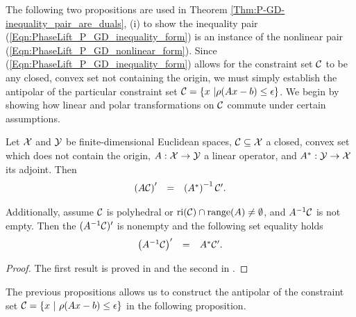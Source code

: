 The following two propositions are used in Theorem \ref{Thm:P-GD-inequality_pair_are_duals}, (i) to show the inequality pair (\ref{Eqn:PhaseLift_P_GD_inequality_form}) is an instance of the nonlinear pair (\ref{Eqn:PhaseLift_P_GD_nonlinear_form}).  Since (\ref{Eqn:PhaseLift_P_GD_inequality_form}) allows for the constraint set ${\mathcal C}$ to be any closed, convex set not containing the origin, we must simply establish the antipolar of the particular constraint set ${\mathcal C} = \{ x \ | \rho(Ax-b) \leq \epsilon\}$.  We begin by showing how linear and polar transformations on ${\mathcal C}$ commute under certain assumptions.


\begin{prop}		\label{Prop:antipolar_set_equalities}
Let ${\mathcal X}$ and ${\mathcal Y}$ be finite-dimensional Euclidean spaces, ${\mathcal C} \subseteq {\mathcal X}$ a closed, convex set which does not contain the origin, $A : {\mathcal X} \rightarrow {\mathcal Y}$ a linear operator, and $A^* : {\mathcal Y} \rightarrow {\mathcal X}$ its adjoint.
Then
\begin{equation}		\label{Eqn:antipolar_set_equalities_1}
\begin{array}{rll}
\left( A {\mathcal C} \right)' & = & 	\left( A^* \right)^{-1} {\mathcal C}' .
\end{array}
\end{equation}

Additionally, assume ${\mathcal C}$ is polyhedral or $\textnormal{ri}({\mathcal C}) \cap \textnormal{range}(A) \neq \emptyset$, and $A^{-1}{\mathcal C}$ is not empty.  Then the $( A^{-1} {\mathcal C})'$ is nonempty and the following set equality holds
\begin{equation}		\label{Eqn:antipolar_set_equalities_2}
\begin{array}{rll}
\left( A^{-1} {\mathcal C} \right)' & = &  A^* {\mathcal C}' .
\end{array}
\end{equation}
\end{prop}
\begin{proof}
The first result is proved in \cite[Proposition 3.3]{DBLP:journals/siamjo/FriedlanderMP14} and the second in \cite[Proposition 3.4, 3.5]{DBLP:journals/siamjo/FriedlanderMP14}.
\end{proof}


The previous propositions allows us to construct the antipolar of the constraint set ${\mathcal C} = \{ x \ | \ \rho(Ax-b) \leq \epsilon \}$ in the following proposition.


